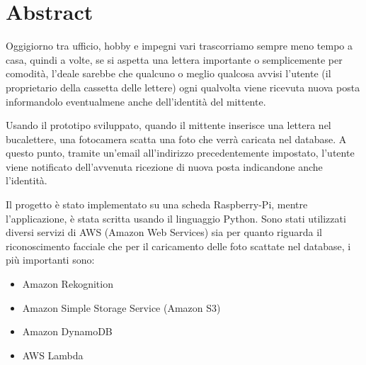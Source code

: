 \chapter{Abstract}
\label{ch:abstract}
Oggigiorno tra ufficio, hobby e impegni vari trascorriamo sempre meno tempo a casa, quindi a volte, se si aspetta una lettera importante o semplicemente per
comodità, l'deale sarebbe che qualcuno o meglio qualcosa avvisi l'utente (il proprietario della cassetta delle lettere) ogni qualvolta viene ricevuta nuova 
posta informandolo eventualmene anche dell'identità del mittente.

Usando il prototipo sviluppato, quando il mittente inserisce una lettera nel bucalettere, una fotocamera scatta una foto che verrà caricata nel database. A questo
punto, tramite un'email all'indirizzo precedentemente impostato, l'utente viene notificato dell'avvenuta ricezione di nuova posta indicandone anche l'identità.

Il progetto è stato implementato su una scheda Raspberry-Pi, mentre l'applicazione, è stata scritta usando il linguaggio Python.
Sono stati utilizzati diversi servizi di AWS (Amazon Web Services) sia per quanto riguarda il riconoscimento facciale che per il caricamento delle foto scattate nel 
database, i più importanti sono:
\begin{itemize}
    \item Amazon Rekognition
    \item Amazon Simple Storage Service (Amazon S3)
    \item Amazon DynamoDB
    \item AWS Lambda 
\end{itemize} 